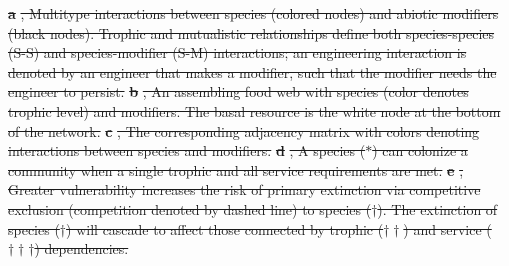 \documentclass[twocolumn,preprintnumbers,amsmath,amssymb,superscriptaddress,linenumbers]{revtex4-1}
\providecommand{\DIFdel}[1]{{\protect\color{red}\sout{#1}}}                      %
\providecommand{\DIFdelbegin}{} %
\providecommand{\DIFdelFL}[1]{\DIFdel{#1}} %
\newcommand{\DIFscaledelfig}{0.5}
\newlength{\DIFdelgraphicswidth} %
\newlength{\DIFdelgraphicsheight} %
\newcommand{\DIFdelincludegraphics}[2][]{%
\sbox{\DIFdelgraphicsbox}{\DIFOincludegraphics[#1]{#2}}%
\settoboxwidth{\DIFdelgraphicswidth}{\DIFdelgraphicsbox} %
\settoboxtotalheight{\DIFdelgraphicsheight}{\DIFdelgraphicsbox} %
\scalebox{\DIFscaledelfig}{%
\parbox[b]{\DIFdelgraphicswidth}{\usebox{\DIFdelgraphicsbox}\\[-\baselineskip] \rule{\DIFdelgraphicswidth}{0em}}\llap{\resizebox{\DIFdelgraphicswidth}{\DIFdelgraphicsheight}{%
\setlength{\unitlength}{\DIFdelgraphicswidth}%
\begin{picture}(1,1)%
\thicklines\linethickness{2pt} %
{\color[rgb]{1,0,0}\put(0,0){\framebox(1,1){}}}%
{\color[rgb]{1,0,0}\put(0,0){\line( 1,1){1}}}%
{\color[rgb]{1,0,0}\put(0,1){\line(1,-1){1}}}%
\end{picture}%
}\hspace*{3pt}}} %
} %
\DeclareRobustCommand{\DIFdelbegin}{\DIFOdelbegin \let\includegraphics\DIFdelincludegraphics} %
\begin{document}
\DIFdelbegin %
{%
\textbf{\DIFdelFL{a}}%
\DIFdelFL{, Multitype interactions between species (colored nodes) and abiotic modifiers (black nodes).
Trophic and mutualistic relationships define both species-species (S-S) and species-modifier (S-M) interactions; an engineering interaction is denoted by an engineer that makes a modifier, such that the modifier needs the engineer to persist.
}\textbf{\DIFdelFL{b}}%
\DIFdelFL{, An assembling food web with species (color denotes trophic level) and modifiers. The basal resource is the white node at the bottom of the network.
}\textbf{\DIFdelFL{c}}%
\DIFdelFL{, The corresponding adjacency matrix with colors denoting interactions between species and modifiers.
}\textbf{\DIFdelFL{d}}%
\DIFdelFL{, A species ($\ast$) can colonize a community when a single trophic and all service requirements are met.
}\textbf{\DIFdelFL{e}}%
\DIFdelFL{, Greater vulnerability increases the risk of primary extinction via competitive exclusion (competition denoted by dashed line) to species ($\dag$).
The extinction of species ($\dag$) will cascade to affect those connected by trophic ($\dag \dag$) and service ($\dag \dag \dag$) dependencies. 
}%
}
\end{document}
